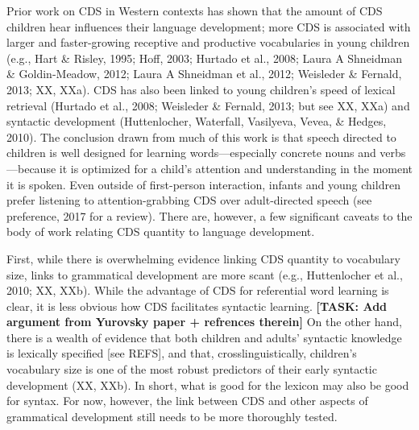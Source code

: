 \documentclass[floatsintext,man]{apa6}
\theoremstyle{definition}
\theoremstyle{definition}
\theoremstyle{definition}
\theoremstyle{remark}
\begin{document}
Prior work on CDS in Western contexts has shown that the amount of CDS
children hear influences their language development; more CDS is
associated with larger and faster-growing receptive and productive
vocabularies in young children (e.g., Hart \& Risley, 1995; Hoff, 2003;
Hurtado et al., 2008; Laura A Shneidman \& Goldin-Meadow, 2012; Laura A
Shneidman et al., 2012; Weisleder \& Fernald, 2013; XX, XXa). CDS has
also been linked to young children's speed of lexical retrieval (Hurtado
et al., 2008; Weisleder \& Fernald, 2013; but see XX, XXa) and syntactic
development (Huttenlocher, Waterfall, Vasilyeva, Vevea, \& Hedges,
2010). The conclusion drawn from much of this work is that speech
directed to children is well designed for learning words---especially
concrete nouns and verbs---because it is optimized for a child's
attention and understanding in the moment it is spoken. Even outside of
first-person interaction, infants and young children prefer listening to
attention-grabbing CDS over adult-directed speech (see preference, 2017
for a review). There are, however, a few significant caveats to the body
of work relating CDS quantity to language development.

First, while there is overwhelming evidence linking CDS quantity to
vocabulary size, links to grammatical development are more scant (e.g.,
Huttenlocher et al., 2010; XX, XXb). While the advantage of CDS for
referential word learning is clear, it is less obvious how CDS
facilitates syntactic learning. \textbf{{[}TASK: Add argument from
Yurovsky paper + refrences therein{]}} On the other hand, there is a
wealth of evidence that both children and adults' syntactic knowledge is
lexically specified {[}see REFS{]}, and that, crosslinguistically,
children's vocabulary size is one of the most robust predictors of their
early syntactic development (XX, XXb). In short, what is good for the
lexicon may also be good for syntax. For now, however, the link between
CDS and other aspects of grammatical development still needs to be more
thoroughly tested.
\end{document}
